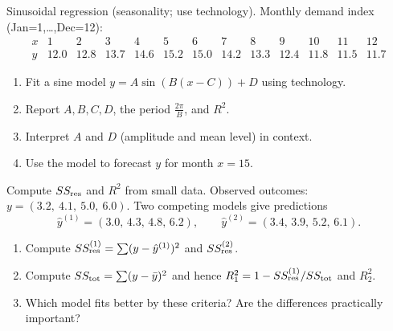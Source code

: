 \documentclass[11pt]{article}
\def\textbf#1{#1}%
\newcounter{question}
\begin{document}
\begin{question}
\textbf{Sinusoidal regression (seasonality; use technology).}
Monthly demand index (Jan=1,\ldots,Dec=12):
\[
\begin{array}{c|cccccccccccc}
x & 1&2&3&4&5&6&7&8&9&10&11&12\\\hline
y & 12.0&12.8&13.7&14.6&15.2&15.0&14.2&13.3&12.4&11.8&11.5&11.7
\end{array}
\]
\begin{enumerate}
  \item Fit a sine model $y=A\sin(B(x-C))+D$ using technology.
  \item Report $A,B,C,D$, the period $\frac{2\pi}{B}$, and $R^2$.
  \item Interpret $A$ and $D$ (amplitude and mean level) in context.
  \item Use the model to forecast $y$ for month $x=15$.
\end{enumerate}

\begin{center}
\end{center}
\end{question}

\begin{question}
\textbf{Compute $SS_{\rm res}$ and $R^2$ from small data.}
Observed outcomes: $y=(3.2,\ 4.1,\ 5.0,\ 6.0)$. Two competing models give predictions
\[
\hat y^{(1)}=(3.0,\,4.3,\,4.8,\,6.2),\qquad
\hat y^{(2)}=(3.4,\,3.9,\,5.2,\,6.1).
\]
\begin{enumerate}
  \item Compute $SS_{\rm res}^{(1)}=\sum(y-\hat y^{(1)})^2$ and $SS_{\rm res}^{(2)}$.
  \item Compute $SS_{\rm tot}=\sum (y-\bar y)^2$ and hence $R_1^2=1-SS_{\rm res}^{(1)}/SS_{\rm tot}$ and $R_2^2$.
  \item Which model fits better by these criteria? Are the differences practically important?
\end{enumerate}
\end{question}
\end{document}
